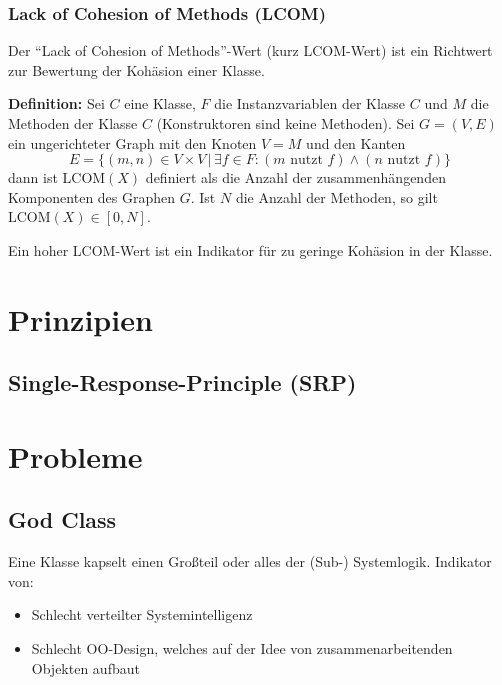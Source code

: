 			\subsubsection{Lack of Cohesion of Methods (LCOM)}
				Der \enquote{Lack of Cohesion of Methods}-Wert (kurz LCOM-Wert) ist ein Richtwert zur Bewertung der Kohäsion einer Klasse.

				\textbf{Definition:} Sei $ C $ eine Klasse, $ F $ die Instanzvariablen der Klasse $ C $ und $ M $ die Methoden der Klasse $ C $ (Konstruktoren sind keine Methoden). Sei $ G = (V, E) $ ein ungerichteter Graph mit den Knoten $ V = M $ und den Kanten \[ E = \{ (m, n) \in V \times V \,|\, \exists f \in F : (m \text{ nutzt } f) \land (n \text{ nutzt } f) \} \] dann ist $ \text{LCOM}(X) $ definiert als die Anzahl der zusammenhängenden Komponenten des Graphen $ G $. Ist $ N $ die Anzahl der Methoden, so gilt $ \text{LCOM}(X) \in [0, N] $.

				Ein hoher LCOM-Wert ist ein Indikator für zu geringe Kohäsion in der Klasse.

	\section{Prinzipien}
		\subsection{Single-Response-Principle (SRP)}

	\section{Probleme}
		\subsection{God Class}
			Eine Klasse kapselt einen Großteil oder alles der (Sub-) Systemlogik. Indikator von:
			\begin{itemize}
				\item Schlecht verteilter Systemintelligenz
				\item Schlecht OO-Design, welches auf der Idee von zusammenarbeitenden Objekten aufbaut
			\end{itemize}

